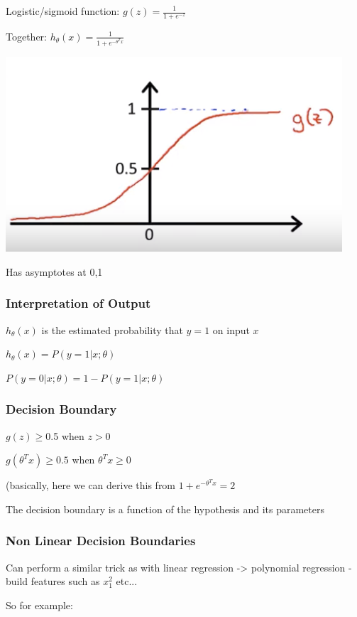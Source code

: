 Logistic/sigmoid function: $g(z) = \frac{1}{1+e^{-z}}$

Together: $h_\theta(x)=\frac{1}{1+e^{-\theta^T x}}$

\includegraphics[width=0.9\columnwidth]{ml_figures/sigmoid.png}

Has  asymptotes at {0,1}

\subsubsection{Interpretation of Output}

$h_\theta(x)$ is the estimated probability that  $y=1$ on input $x$ 

$h_\theta(x) = P(y=1|x;\theta)$ 

$P(y=0|x;\theta) = 1-P(y=1|x;\theta)$

\subsubsection{Decision Boundary}

$g(z) \ge 0$.5 when $z>0$ 

$g(\theta^T x ) \ge 0.5$ when $\theta^Tx \ge 0$

(basically, here we  can derive this from $1+e^{-\theta^T x}  = 2$

The decision boundary is a function of the hypothesis and its parameters

\subsubsection{Non Linear Decision Boundaries}

Can perform a similar trick as with linear regression -> polynomial regression - build features such as $x_1^2$ etc...

So for example: 

